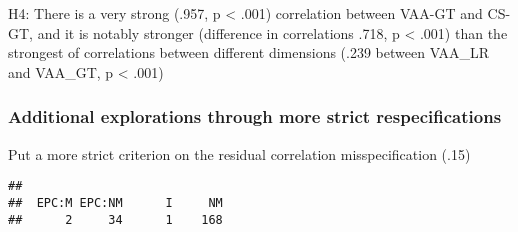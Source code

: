 \documentclass[
]{article}
\newenvironment{Shaded}{\begin{snugshade}}{\end{snugshade}}
\newcommand{\CommentTok}[1]{\textcolor[rgb]{0.56,0.35,0.01}{\textit{#1}}}
\newcommand{\DataTypeTok}[1]{\textcolor[rgb]{0.13,0.29,0.53}{#1}}
\newcommand{\DecValTok}[1]{\textcolor[rgb]{0.00,0.00,0.81}{#1}}
\newcommand{\KeywordTok}[1]{\textcolor[rgb]{0.13,0.29,0.53}{\textbf{#1}}}
\newcommand{\NormalTok}[1]{#1}
\newcommand{\OperatorTok}[1]{\textcolor[rgb]{0.81,0.36,0.00}{\textbf{#1}}}
\newcommand{\StringTok}[1]{\textcolor[rgb]{0.31,0.60,0.02}{#1}}
\begin{document}
H4: There is a very strong (.957, p \textless{} .001) correlation
between VAA-GT and CS-GT, and it is notably stronger (difference in
correlations .718, p \textless{} .001) than the strongest of
correlations between different dimensions (.239 between VAA\_LR and
VAA\_GT, p \textless{} .001)

\hypertarget{additional-explorations-through-more-strict-respecifications}{%
\subsubsection{Additional explorations through more strict
respecifications}\label{additional-explorations-through-more-strict-respecifications}}

Put a more strict criterion on the residual correlation misspecification
(.15)

\begin{Shaded}
\end{Shaded}

\begin{verbatim}
## 
##  EPC:M EPC:NM      I     NM 
##      2     34      1    168
\end{verbatim}
\end{document}
